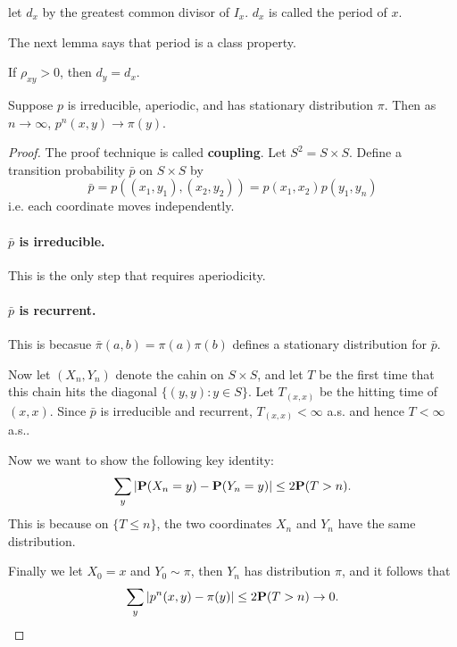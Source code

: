 \begin{example}
    
\end{example}
\begin{definition}[period]
    let $d_x$ by the greatest common divisor of $I_x$. $d_x$ is called the period of $x$.
\end{definition}
The next lemma says that period is a class property.
\begin{lemma}
    If $\rho_{xy}>0$, then $d_y=d_x$.
\end{lemma}

\begin{theorem}
    Suppose $p$ is irreducible, aperiodic, and has stationary distribution $\pi$. Then as $n\to\infty$, $p^n(x,y)\to \pi(y)$.
\end{theorem}
\begin{proof}
    The proof technique is called \textbf{coupling}. Let $S^2=S\times S$. Define a transition probability $\bar{p}$ on $S\times S$ by 
    \[ \bar{p}=p((x_1,y_1),(x_2,y_2))=p(x_1,x_2)p(y_1,y_n) \] 
    i.e. each coordinate moves independently. 

    \paragraph{ $\bar{p}$ is irreducible.} This is the only step that requires aperiodicity.

    \paragraph{ $\bar{p}$ is recurrent.} This is becasue $\bar{\pi}(a,b)=\pi(a)\pi(b)$ defines a stationary distribution for $\bar{p}$. 

    Now let $(X_n,Y_n)$ denote the cahin on $S\times S$, and let $T$ be the first time that this chain hits the diagonal $\{(y,y):y\in S\}$. Let 
    $T_{(x,x)}$ be the hitting time of $(x,x)$. Since $\bar{p}$ is irreducible and recurrent, $T_{(x,x)}<\infty$ a.s. and hence $T<\infty$ a.s..

    Now we want to show the following key identity:
    \[\sum_{y}|\mathbf{P}(X_n=y)-\mathbf{P}(Y_n=y)|\leq 2 \mathbf{P}(T>n). \] 
    This is because on $\{T\leq n\}$, the two coordinates $X_n$ and $Y_n$ have the same distribution.

    Finally we let $X_0=x$ and $Y_0\sim \pi$, then $Y_n$ has distribution $\pi$, and it follows that 
    \[\sum_{y}|p^n(x,y)-\pi(y)|\leq 2 \mathbf{P}(T>n)\to 0. \] 
\end{proof}
